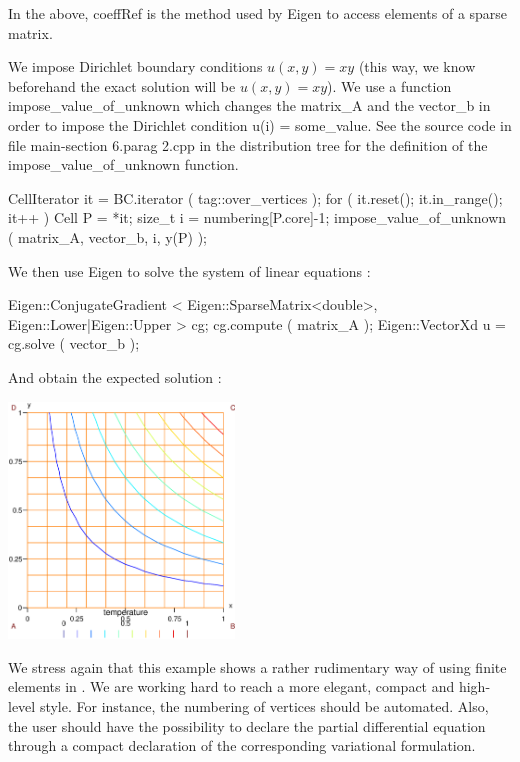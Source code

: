 In the above, {\codett coeffRef} is the method used by {\codett Eigen} to access elements of
a sparse matrix.

We impose Dirichlet boundary conditions $ u(x,y) = xy $ (this way, we know beforehand
the exact solution will be $ u(x,y) = xy $).
We use a function {\codett impose\_value\_of\_unknown} which changes the {\codett matrix\_A}
and the {\codett vector\_b} in order to impose the Dirichlet condition {\codett u(i) = 
some\_value}. See the source code in file {\codett main-\numb section 6.\numb parag 2.cpp}
in the distribution tree for the definition of the {\codett impose\_value\_of\_unknown}
function.

\verbatim
   CellIterator it = BC.iterator ( tag::over_vertices );
   for ( it.reset(); it.in_range(); it++ )
   {   Cell P = *it;
       size_t i = numbering[P.core]-1;
       impose_value_of_unknown ( matrix_A, vector_b, i, y(P) );  }
\endverbatim

We then use {\codett Eigen} to solve the system of linear equations :

\verbatim
   Eigen::ConjugateGradient < Eigen::SparseMatrix<double>,
                              Eigen::Lower|Eigen::Upper    > cg;
   cg.compute ( matrix_A );
   Eigen::VectorXd u = cg.solve ( vector_b );
\endverbatim

And obtain the expected solution :

\bigskip
{ 
\centerline{\includegraphics[width=60mm]{square-Dirichlet.eps}} }

We stress again that this example shows a rather rudimentary way of using finite elements in
\maniFEM.
We are working hard to reach a more elegant, compact and high-level style.
For instance, the numbering of vertices should be automated.
Also, the user should have the possibility to declare the partial differential equation
through a compact declaration of the corresponding variational formulation.

